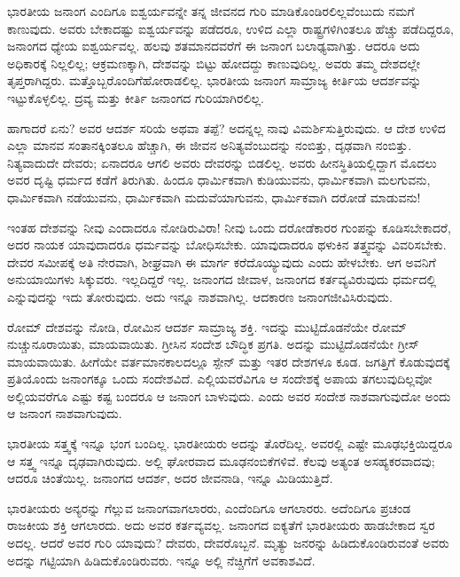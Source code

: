 ಭಾರತೀಯ ಜನಾಂಗ ಎಂದಿಗೂ ಐಶ್ವರ್ಯವನ್ನೇ ತನ್ನ ಜೀವನದ ಗುರಿ ಮಾಡಿಕೊಂಡಿರಲಿಲ್ಲವೆಂಬುದು ನಮಗೆ ಕಾಣುವುದು. ಅವರು ಬೇಕಾದಷ್ಟು ಐಶ್ವರ್ಯವನ್ನು ಪಡೆದರೂ, ಉಳಿದ ಎಲ್ಲಾ ರಾಷ್ಟ್ರಗಳಿಗಿಂತಲೂ ಹೆಚ್ಚು ಪಡೆದಿದ್ದರೂ, ಜನಾಂಗದ ಧ್ಯೇಯ ಐಶ್ವರ್ಯವಲ್ಲ. ಹಲವು ಶತಮಾನದವರೆಗೆ ಈ ಜನಾಂಗ ಬಲಾಢ್ಯವಾಗಿತ್ತು. ಆದರೂ ಅದು ಅಧಿಕಾರಕ್ಕೆ ನಿಲ್ಲಲಿಲ್ಲ; ಆಕ್ರಮಣಕ್ಕಾಗಿ, ದೇಶವನ್ನು ಬಿಟ್ಟು ಹೋದದ್ದು ಕಾಣುವುದಿಲ್ಲ. ಅವರು ತಮ್ಮ ದೇಶದಲ್ಲೇ ತೃಪ್ತರಾಗಿದ್ದರು. ಮತ್ತೊಬ್ಬರೊಂದಿಗೆ\break ಹೋರಾಡಲಿಲ್ಲ. ಭಾರತೀಯ ಜನಾಂಗ ಸಾಮ್ರಾಜ್ಯ ಕೀರ್ತಿಯ ಆದರ್ಶವನ್ನು ಇಟ್ಟುಕೊಳ್ಳಲಿಲ್ಲ. ದ್ರವ್ಯ ಮತ್ತು ಕೀರ್ತಿ ಜನಾಂಗದ ಗುರಿಯಾಗಿರಲಿಲ್ಲ.

ಹಾಗಾದರೆ ಏನು? ಅವರ ಆದರ್ಶ ಸರಿಯೆ ಅಥವಾ ತಪ್ಪೆ? ಅದನ್ನಲ್ಲ ನಾವು ವಿಮರ್ಶಿಸುತ್ತಿರುವುದು. ಆ ದೇಶ ಉಳಿದ ಎಲ್ಲಾ ಮಾನವ ಸಂತಾನಕ್ಕಿಂತಲೂ ಹೆಚ್ಚಾಗಿ, ಈ ಜೀವನ ಅನಿತ್ಯವೆಂಬುದನ್ನು ನಂಬಿತ್ತು, ದೃಢವಾಗಿ ನಂಬಿತ್ತು. ನಿತ್ಯವಾದುದೇ ದೇವರು; ಏನಾದರೂ ಆಗಲಿ ಅವರು ದೇವರನ್ನು ಬಿಡಲಿಲ್ಲ. ಅವರು ಹೀನಸ್ಥಿತಿಯಲ್ಲಿದ್ದಾಗ ಮೊದಲು ಅವರ ದೃಷ್ಟಿ ಧರ್ಮದ ಕಡೆಗೆ ತಿರುಗಿತು. ಹಿಂದೂ ಧಾರ್ಮಿಕವಾಗಿ ಕುಡಿಯುವನು, ಧಾರ್ಮಿಕವಾಗಿ ಮಲಗುವನು, ಧಾರ್ಮಿಕವಾಗಿ ನಡೆಯುವನು, ಧಾರ್ಮಿಕವಾಗಿ ಮದುವೆಯಾಗುವನು, ಧಾರ್ಮಿಕವಾಗಿ ದರೋಡೆ ಮಾಡುವನು!

ಇಂತಹ ದೇಶವನ್ನು ನೀವು ಎಂದಾದರೂ ನೋಡಿರುವಿರಾ! ನೀವು ಒಂದು ದರೋಡೆಕಾರರ ಗುಂಪನ್ನು ಕೂಡಿಸಬೇಕಾದರೆ, ಅದರ ನಾಯಕ ಯಾವುದಾದರೂ ಧರ್ಮವನ್ನು ಬೋಧಿಸಬೇಕು. ಯಾವುದಾದರೂ ಥಳುಕಿನ ತತ್ತ್ವವನ್ನು ವಿವರಿಸಬೇಕು. ದೇವರ ಸಮೀಪಕ್ಕೆ ಅತಿ ನೇರವಾಗಿ, ಶೀಘ್ರವಾಗಿ ಈ ಮಾರ್ಗ ಕರೆದೊಯ್ಯುವುದು ಎಂದು ಹೇಳಬೇಕು. ಆಗ ಅವನಿಗೆ ಅನುಯಾಯಿಗಳು ಸಿಕ್ಕುವರು. ಇಲ್ಲದಿದ್ದರೆ ಇಲ್ಲ. ಜನಾಂಗದ ಜೀವಾಳ, ಜನಾಂಗದ ಕರ್ತವ್ಯವಿರುವುದು ಧರ್ಮದಲ್ಲಿ ಎನ್ನುವುದನ್ನು ಇದು ತೋರುವುದು. ಅದು ಇನ್ನೂ ನಾಶವಾಗಿಲ್ಲ. ಆದಕಾರಣ ಜನಾಂಗ\break ಜೀವಿಸಿರುವುದು.

\newpage

ರೋಮ್ ದೇಶವನ್ನು ನೋಡಿ, ರೋಮಿನ ಆದರ್ಶ ಸಾಮ್ರಾಜ್ಯ ಶಕ್ತಿ. ಇದನ್ನು ಮುಟ್ಟಿದೊಡನೆಯೇ ರೋಮ್ ನುಚ್ಚುನೂರಾಯಿತು, ಮಾಯವಾಯಿತು. ಗ್ರೀಸಿನ ಸಂದೇಶ ಬೌದ್ಧಿಕ ಪ್ರಗತಿ. ಅದನ್ನು ಮುಟ್ಟಿದೊಡನೆಯೇ ಗ್ರೀಸ್ ಮಾಯವಾಯಿತು. ಹೀಗೆಯೇ ವರ್ತಮಾನಕಾಲದಲ್ಲೂ ಸ್ಪೇನ್ ಮತ್ತು ಇತರ ದೇಶಗಳೂ ಕೂಡ. ಜಗತ್ತಿಗೆ ಕೊಡುವುದಕ್ಕೆ ಪ್ರತಿಯೊಂದು ಜನಾಂಗಕ್ಕೂ ಒಂದು ಸಂದೇಶವಿದೆ. ಎಲ್ಲಿಯವರೆವಿಗೂ ಆ ಸಂದೇಶಕ್ಕೆ ಅಪಾಯ ತಗಲುವುದಿಲ್ಲವೋ ಅಲ್ಲಿಯವರೆಗೂ ಎಷ್ಟು ಕಷ್ಟ ಬಂದರೂ ಆ ಜನಾಂಗ ಬಾಳುವುದು. ಎಂದು ಅವರ ಸಂದೇಶ ನಾಶವಾಗುವುದೋ ಅಂದು ಆ ಜನಾಂಗ ನಾಶವಾಗುವುದು.

ಭಾರತೀಯ ಸತ್ತ್ವಕ್ಕೆ ಇನ್ನೂ ಭಂಗ ಬಂದಿಲ್ಲ. ಭಾರತೀಯರು ಅದನ್ನು ತೊರೆದಿಲ್ಲ. ಅವರಲ್ಲಿ ಎಷ್ಟೇ ಮೂಢಭಕ್ತಿಯಿದ್ದರೂ ಆ ಸತ್ತ್ವ ಇನ್ನೂ ದೃಢವಾಗಿರುವುದು. ಅಲ್ಲಿ ಘೋರವಾದ ಮೂಢನಂಬಿಕೆಗಳಿವೆ. ಕೆಲವು ಅತ್ಯಂತ ಅಸಹ್ಯಕರವಾದವು; ಆದರೂ ಚಿಂತೆಯಿಲ್ಲ. ಜನಾಂಗದ ಆದರ್ಶ, ಅದರ ಜೀವನಾಡಿ, ಇನ್ನೂ ಮಿಡಿಯುತ್ತಿದೆ.

ಭಾರತೀಯರು ಅನ್ಯರನ್ನು ಗೆಲ್ಲುವ ಜನಾಂಗವಾಗಲಾರರು, ಎಂದೆಂದಿಗೂ ಆಗಲಾರರು. ಅದೆಂದಿಗೂ ಪ್ರಚಂಡ ರಾಜಕೀಯ ಶಕ್ತಿ ಆಗಲಾರದು. ಅದು ಅವರ ಕರ್ತವ್ಯವಲ್ಲ. ಜನಾಂಗದ ಐಕ್ಯತೆಗೆ ಭಾರತೀಯರು ಹಾಡಬೇಕಾದ ಸ್ವರ ಅದಲ್ಲ. ಆದರೆ ಅವರ ಗುರಿ ಯಾವುದು? ದೇವರು, ದೇವರೊಬ್ಬನೆ. ಮೃತ್ಯು ಜನರನ್ನು ಹಿಡಿದುಕೊಂಡಿರುವಂತೆ ಅವರು ಅದನ್ನು ಗಟ್ಟಿಯಾಗಿ ಹಿಡಿದುಕೊಂಡಿರುವರು. ಇನ್ನೂ ಅಲ್ಲಿ ನೆಚ್ಚಿಗೆಗೆ ಅವಕಾಶವಿದೆ.

